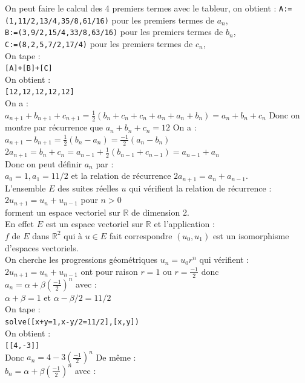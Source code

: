 \documentclass[a4paper,11pt]{book}
\newcommand{\R}{{\mathbb{R}}}
\begin{document}
\begin{enumerate}
On peut faire le calcul des 4 premiers termes avec le tableur, on obtient :
{\tt A:=(1,11/2,13/4,35/8,61/16)} pour les premiers termes de $a_n$,\\
{\tt B:=(3,9/2,15/4,33/8,63/16)} pour les premiers termes de $b_n$,\\
{\tt C:=(8,2,5,7/2,17/4)} pour les premiers termes de $c_n$,\\
On tape :\\
{\tt [A]+[B]+[C]}\\
On obtient :\\
{\tt [12,12,12,12,12]}\\
On a :\\
$a_{n+1}+b_{n+1}+c_{n+1}=\frac{1}{2}(b_n+c_n+c_n+a_n+a_n+b_n)=a_n+b_n+c_n$
Donc on montre par r\'ecurrence que $a_n+b_n+c_n=12$
On a :\\
$a_{n+1}-b_{n+1}=\frac{1}{2}(b_n-a_n)=\frac{-1}{2}(a_n-b_n)$\\
$2a_{n+1}=b_n+c_n=a_{n-1}+\frac{1}{2}(b_{n-1}+c_{n-1})=a_{n-1}+a_n$\\
Donc on peut d\'efinir $a_n$ par :\\
$a_0=1,a_1=11/2$ et la relation de r\'ecurrence $2a_{n+1}=a_n+a_{n-1}$.\\
L'ensemble $E$ des suites r\'eelles $u$ qui v\'erifient la relation de 
r\'ecurrence :\\
$2u_{n+1}=u_n+u_{n-1}$ pour $n>0$\\
forment un espace vectoriel sur $\R$ de dimension 2.\\
En effet $E$ est un espace vectoriel sur $\R$ et l'application :\\
$f$ de $E$ dans $\R^2$ qui \`a $u\in E$ fait correspondre $(u_0,u_1)$ est un 
isomorphisme d'espaces vectoriels.\\ 
On cherche les progressions g\'eom\'etriques $u_n=u_0r^n$ qui v\'erifient :\\
$2u_{n+1}=u_n+u_{n-1}$ ont pour raison $r=1$ ou $r=\frac{-1}{2}$ donc \\
$a_n=\alpha+\beta(\frac{-1}{2})^n$ avec :\\
$\alpha+\beta=1$ et $\alpha-\beta/2=11/2$\\
On tape :\\
{\tt solve([x+y=1,x-y/2=11/2],[x,y])}\\
On obtient :\\
{\tt [[4,-3]]}\\
Donc $a_n=4-3(\frac{-1}{2})^n$
De m\^eme :\\
$b_n=\alpha+\beta(\frac{-1}{2})^n$ avec :\\

\end{enumerate}
\end{document}
